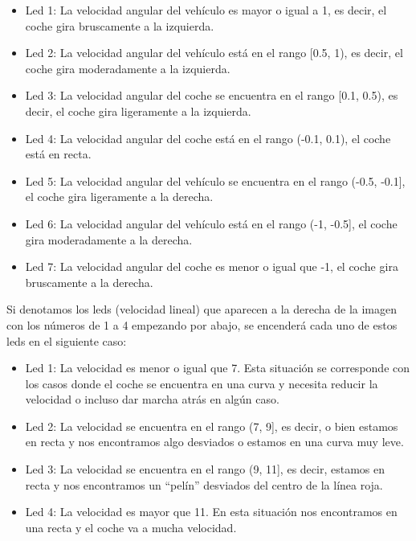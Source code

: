 \begin{itemize}
    \item Led 1: La velocidad angular del vehículo es mayor o igual a 1, es decir, el coche gira bruscamente a la izquierda.
    
    \item Led 2: La velocidad angular del vehículo está en el rango [0.5, 1), es decir, el coche gira moderadamente a la izquierda.
    
    \item Led 3:  La velocidad angular del coche se encuentra en el rango [0.1, 0.5), es decir, el coche gira ligeramente a la izquierda.
    
    \item Led 4: La velocidad angular del coche está en el rango (-0.1, 0.1), el coche está en recta.
    
    \item Led 5: La velocidad angular del vehículo se encuentra en el rango (-0.5, -0.1],  el coche gira ligeramente a la derecha.
    
     \item Led 6: La velocidad angular del vehículo está en el rango (-1, -0.5], el coche gira moderadamente a la derecha.
     
     \item Led 7: La velocidad angular del coche es menor o igual que -1, el coche gira bruscamente a la derecha.
\end{itemize}

Si denotamos los leds (velocidad lineal) que aparecen a la derecha de la imagen con los números de 1 a 4 empezando por abajo, se encenderá cada uno de estos leds en el siguiente caso:

\begin{itemize}
    \item Led 1: La velocidad es menor o igual que 7. Esta situación se corresponde con los casos donde el coche se encuentra en una curva y necesita reducir la velocidad o incluso dar marcha atrás en algún caso.
    
    \item Led 2: La velocidad se encuentra en el rango (7, 9], es decir, o bien estamos en recta y nos encontramos algo desviados o estamos en una curva muy leve.
    
    \item Led 3: La velocidad se encuentra en el rango (9, 11], es decir, estamos en recta y nos encontramos un ``pelín'' desviados del centro de la línea roja.
    
    \item Led 4: La velocidad es mayor que 11. En esta situación nos encontramos en una recta y el coche va a mucha velocidad.
\end{itemize}


